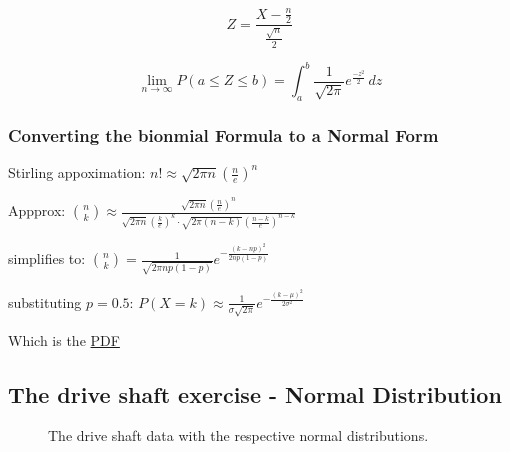 \documentclass[
  a4paper,
]{scrbook}
\begin{document}
\[Z = \frac{X-\frac{n}{2}}{\frac{\sqrt{n}}{2}}\]

\[\lim_{n\to\infty} P(a\leq Z \leq b)= \int_a^b \frac{1}{\sqrt{2\pi}}e^\frac{-z^2}{2} \,dz \]

\subsubsection{Converting the bionmial Formula to a Normal
Form}\label{converting-the-bionmial-formula-to-a-normal-form}

Stirling appoximation:
\(n!\approx\sqrt{2\pi n} \left( \frac{n}{e} \right)^n\)

Appprox:
\(\binom{n}{k} \approx \frac{\sqrt{2\pi n} \left( \frac{n}{e} \right)^n}{\sqrt{2\pi n} \left( \frac{k}{e} \right)^k \cdot \sqrt{2\pi(n-k)} \left( \frac{n-k}{e} \right)^{n-k}}\)

simplifies to:
\(\binom{n}{k} = \frac{1}{\sqrt{2\pi n p (1-p)}}e^{-\frac{(k-np)^2}{2np(1-p)}}\)

substituting \(p=0.5\):
\(P(X = k) \approx \frac{1}{\sigma\sqrt{2\pi}}e^{-\frac{(k-\mu)^2}{2\sigma^2}}\)

Which is the \hyperref[acronyms_PDF]{PDF}

\subsection{The drive shaft exercise - Normal
Distribution}\label{the-drive-shaft-exercise---normal-distribution}

\begin{figure}[ht]


\caption{\label{fig-ds-nd}The drive shaft data with the respective
normal distributions.}

\end{figure}%
\end{document}
